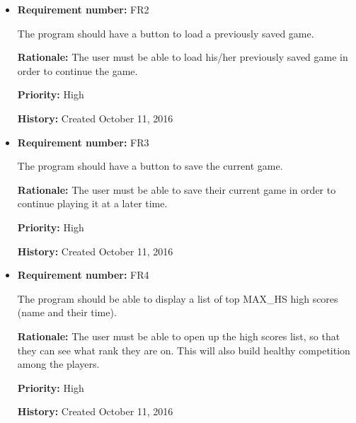 \documentclass[12pt,letterpaper]{article}
\begin{document}
\begin{reqbox}
	\begin{itemize}

		\item \textbf{Requirement number: }FR2  
		
		 The program should have a button to load a previously saved game.

		\textbf{Rationale: }The user must be able to load his/her previously saved game in order to continue the game.

		\textbf{Priority: }High

		\textbf{History: }Created October 11, 2016
	\end{itemize}
\end{reqbox}

\begin{reqbox}
	\begin{itemize}

		\item \textbf{Requirement number: }FR3

		The program should have a button to save the current game.

		\textbf{Rationale: }The user must be able to save their current game in order to continue playing it at a later time.

		\textbf{Priority: }High

		\textbf{History: }Created October 11, 2016

	\end{itemize}
\end{reqbox}

\begin{reqbox}
	\begin{itemize}

		\item \textbf{Requirement number: }FR4

		The program should be able to display a list of top MAX_HS high scores (name and their time). 

		\textbf{Rationale: }The user must be able to open up the high scores list, so that they can see what rank they are on. This will also build healthy competition among the players.

		\textbf{Priority: }High

		\textbf{History: }Created October 11, 2016

	\end{itemize}
\end{reqbox}
\end{document}

